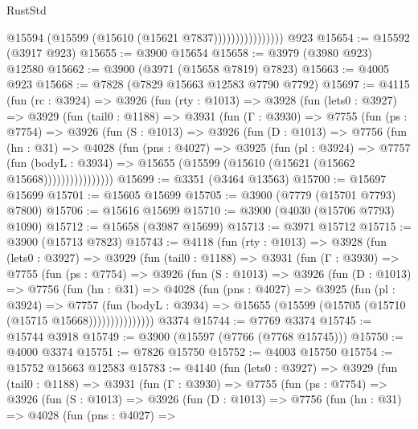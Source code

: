 \begin{lexlean}{RustStd}
\begin{coremodule}
                            @15594 (@15599 (@15610 (@15621 @7837))))))))))))))))
    @923
@15654 := @15592 (@3917 @923)
@15655 := @3900 @15654
@15658 := @3979 (@3980 @923) @12580
@15662 := @3900 (@3971 (@15658 @7819) @7823)
@15663 := @4005 @923
@15668 := @7828 (@7829 @15663 @12583 @7790 @7792)
@15697 := @4115
    (fun (rc : @3924) =>
    @3926
      (fun (rty : @1013) =>
      @3928
        (fun (lets0 : @3927) =>
        @3929
          (fun (tail0 : @1188) =>
          @3931
            (fun (Γ : @3930) =>
            @7755
              (fun (ps : @7754) =>
              @3926
                (fun (S : @1013) =>
                @3926
                  (fun (D : @1013) =>
                  @7756
                    (fun (hn : @31) =>
                    @4028
                      (fun (pns : @4027) =>
                      @3925
                        (fun (pl : @3924) =>
                        @7757
                          (fun (bodyL : @3934) =>
                          @15655 (@15599 (@15610 (@15621 (@15662 @15668))))))))))))))))
@15699 := @3351 (@3464 @13563)
@15700 := @15697 @15699
@15701 := @15605 @15699
@15705 := @3900 (@7779 (@15701 @7793) @7800)
@15706 := @15616 @15699
@15710 := @3900 (@4030 (@15706 @7793) @1090)
@15712 := @15658 (@3987 @15699)
@15713 := @3971 @15712
@15715 := @3900 (@15713 @7823)
@15743 := @4118
    (fun (rty : @1013) =>
    @3928
      (fun (lets0 : @3927) =>
      @3929
        (fun (tail0 : @1188) =>
        @3931
          (fun (Γ : @3930) =>
          @7755
            (fun (ps : @7754) =>
            @3926
              (fun (S : @1013) =>
              @3926
                (fun (D : @1013) =>
                @7756
                  (fun (hn : @31) =>
                  @4028
                    (fun (pns : @4027) =>
                    @3925
                      (fun (pl : @3924) =>
                      @7757
                        (fun (bodyL : @3934) =>
                        @15655 (@15599 (@15705 (@15710 (@15715 @15668)))))))))))))))
    @3374
@15744 := @7769 @3374
@15745 := @15744 @3918
@15749 := @3900 (@15597 (@7766 (@7768 @15745)))
@15750 := @4000 @3374
@15751 := @7826 @15750
@15752 := @4003 @15750
@15754 := @15752 @15663 @12583
@15783 := @4140
    (fun (lets0 : @3927) =>
    @3929
      (fun (tail0 : @1188) =>
      @3931
        (fun (Γ : @3930) =>
        @7755
          (fun (ps : @7754) =>
          @3926
            (fun (S : @1013) =>
            @3926
              (fun (D : @1013) =>
              @7756
                (fun (hn : @31) =>
                @4028
                  (fun (pns : @4027) =>

\end{coremodule}
\end{lexlean}
